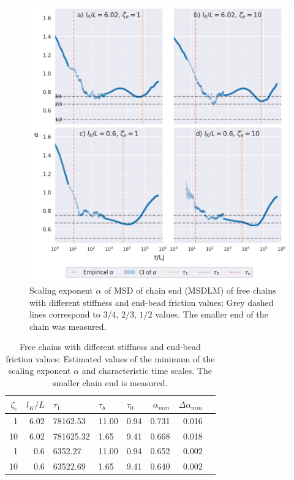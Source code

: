 \documentclass[
    paper=A4,pagesize=automedia,fontsize=12pt,
    BCOR=15mm,DIV=22,
    twoside,headinclude,footinclude=false,
    fleqn,             %
    bibliography=totocnumbered,          %
    listof=totoc,                %
    listof=flat,                 %
    cleardoublepage=empty      %
    numbers=endperiod
]{scrartcl}
\begin{document}
\begin{figure}
    \centering
    \includegraphics[width=\textwidth]{17+18+19+20-exp-alpha-fm.png}
    \caption{Scaling exponent $\alpha$ of MSD of chain end (MSDLM) 
    of free chains with different stiffness and end-bead friction values;
    Grey dashed lines correspond to $3/4$, $2/3$, $1/2$ values.
    The smaller end of the chain was measured. 
    }
    \label{fig:alpha_fm_free}
\end{figure}

\begin{table}[p]
    \centering
    
    \begin{tabular}{rrlllrrr}
        \toprule
        $\zeta_e$ & $l_K/L$ & $\tau_1$ & $\tau_b$ & $\tau_0$ & $\alpha_{min}$ & $\Delta \alpha_{min}$ \\
        \midrule
        1 & 6.02 & 78162.53 & 11.00 & 0.94 & 0.731 & 0.016 \\
        10 & 6.02 & 781625.32 & 1.65 & 9.41 & 0.668 & 0.018 \\
        1 & 0.6 & 6352.27 & 11.00 & 0.94 & 0.652 & 0.002 \\
        10 & 0.6 & 63522.69 & 1.65 & 9.41 & 0.640 & 0.002 \\
        \bottomrule
        \end{tabular}
    \caption{
        Free chains with different stiffness and end-bead friction values: 
        Estimated values of the minimum of the scaling exponent $\alpha$ and
        characteristic time scales. The smaller chain end is measured.
    }
    \label{table:free_chain_alpha_estimations_fm}
\end{table}
\end{document}
